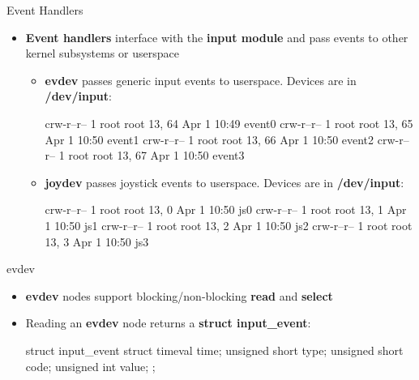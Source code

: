 \begin{frame}
	{Event Handlers}

	\begin{itemize}
      \item
	      \textbf{Event handlers} interface with the \textbf{input module} and pass events to other kernel subsystems or userspace
	\begin{itemize}
	\item
		\textbf{evdev} passes generic input events to userspace.
		Devices are in \textbf{/dev/input}:
			\begin{raw}
crw-r--r--   1 root     root      13,  64 Apr  1 10:49 event0
crw-r--r--   1 root     root      13,  65 Apr  1 10:50 event1
crw-r--r--   1 root     root      13,  66 Apr  1 10:50 event2
crw-r--r--   1 root     root      13,  67 Apr  1 10:50 event3
			\end{raw}
	\item
		\textbf{joydev} passes joystick events to userspace.
		Devices are in \textbf{/dev/input}:
			\begin{raw}
crw-r--r--   1 root     root      13,   0 Apr  1 10:50 js0
crw-r--r--   1 root     root      13,   1 Apr  1 10:50 js1
crw-r--r--   1 root     root      13,   2 Apr  1 10:50 js2
crw-r--r--   1 root     root      13,   3 Apr  1 10:50 js3
			\end{raw}
	\end{itemize}
   \end{itemize}

\end{frame}


\begin{frame}
	{evdev}

	\begin{itemize}
		\item
			\textbf{evdev} nodes support blocking/non-blocking \textbf{read} and \textbf{select}
		\item
			Reading an \textbf{evdev} node returns a \textbf{struct input\_event}:
			\begin{raw}
struct input_event
{
	struct timeval time;
	unsigned short type;
	unsigned short code;
	unsigned int value;
};
			\end{raw}
	\end{itemize}
\end{frame}

